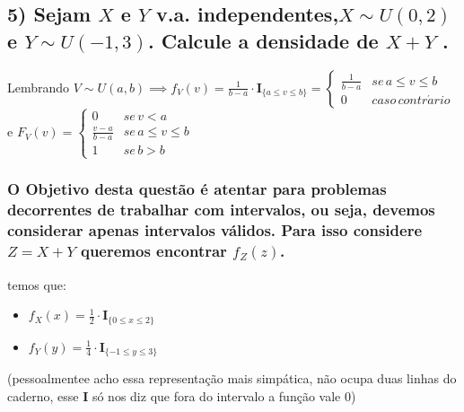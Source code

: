 \documentclass[english]{article}
\begin{document}
\subsection*{\textmd{5) Sejam $X$ e $Y$ v.a. independentes,$X\sim U(0,2)$ e
$Y\sim U(-1,3)$. Calcule a densidade de $X+Y$ . }}

Lembrando $V\sim U(a,b)\implies f_{V}(v)=\frac{1}{b-a}\cdot\mathbf{I}_{\{a\leq v\leq b\}}=\begin{cases}
\frac{1}{b-a} & se\, a\leq v\leq b\\
0 & caso\, contr\acute{a}rio
\end{cases}$ e $F_{V}(v)=\begin{cases}
0 & se\, v<a\\
\frac{v-a}{b-a} & se\, a\leq v\leq b\\
1 & se\, b>b
\end{cases}$


\subsubsection*{\textmd{O Objetivo desta questão é atentar para problemas decorrentes
de trabalhar com intervalos, ou seja, devemos considerar apenas intervalos
válidos. Para isso considere $Z=X+Y$ queremos encontrar $f_{Z}(z)$. }}

temos que:
\begin{itemize}
\item $f_{X}(x)=\frac{1}{2}\cdot\mathbf{I}_{\{0\leq x\leq2\}}$
\item $f_{Y}(y)=\frac{1}{4}\cdot\mathbf{I}_{\{-1\leq y\leq3\}}$
\end{itemize}
(pessoalmentee acho essa representação mais simpática, não ocupa duas
linhas do caderno, esse \textbf{I} só nos diz que fora do intervalo
a função vale 0)
\end{document}
